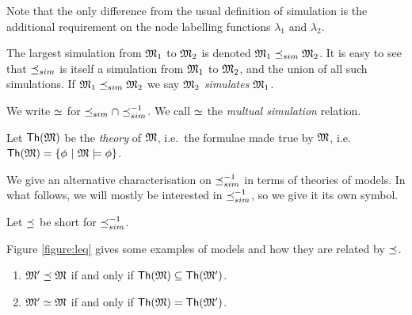 \NI Note that the only difference from the usual definition of
simulation is the additional requirement on the node labelling
functions $\lambda_1$ and $\lambda_2$.

\begin{definition}
The largest simulation from $\frak{M}_1$ to $\frak{M}_2$ is denoted $\frak{M}_1
\preceq_{sim} \frak{M}_2$.  It is easy to see that $\preceq_{sim}$ is itself a
simulation from $\frak{M}_1$ to $\frak{M}_2$, and the union of all such
simulations.  If $\frak{M}_1 \preceq_{sim} \frak{M}_2$ we say $\frak{M}_2$
\emph{simulates} $\frak{M}_1$.

We write $\simeq$ for $\preceq_{sim} \cap \preceq_{sim}^{-1}$. We call $\simeq$ the
\emph{multual simulation} relation.
\end{definition}

\begin{definition}
Let $\mathsf{Th}(\frak{M})$ be the \emph{theory} of $\frak{M}$, i.e.~the formulae
made true by $\frak{M}$, i.e.~$\mathsf{Th}(\frak{M}) = \{\phi\ |\ \frak{M} \models
\phi \}$.
\end{definition}

\NI We give an alternative characterisation on $\preceq_{sim}^{-1}$ in terms of
theories of models. In what follows, we will mostly be interested in
$\preceq_{sim}^{-1}$, so we give it its own symbol.

\begin{definition}
Let $\preceq$  be short for $\preceq_{sim}^{-1}$. 
\end{definition}

\NI Figure \ref{figure:leq} gives some examples of models and how they
are related by $\preceq$.



\begin{theorem}\label{theorem:completeLattice}
\begin{enumerate}

\item\label{theorem:completeLattice:1} $\frak{M}' \preceq \frak{M}$ if and
  only if $\mathsf{Th}(\frak{M}) \subseteq \mathsf{Th}(\frak{M}')$.

\item\label{theorem:completeLattice:2} $\frak{M}' \simeq \frak{M}$ if and
  only if $\mathsf{Th}(\frak{M}) = \mathsf{Th}(\frak{M}')$.

\end{enumerate}
\end{theorem}

